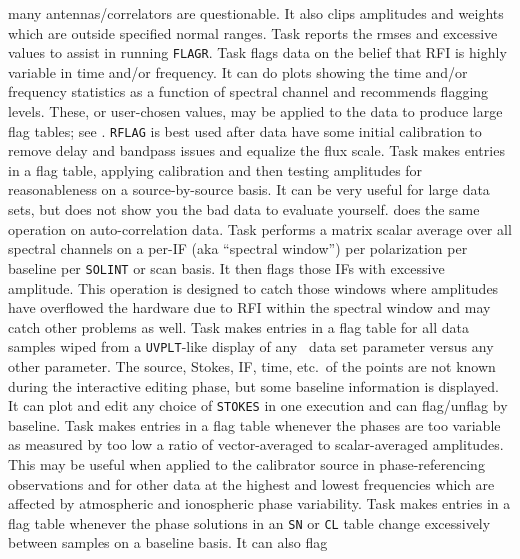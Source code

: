     many antennas/correlators are questionable.  It also clips
    amplitudes and weights which are outside specified normal ranges.
    Task {\tt {}} reports the rmses and excessive values to
    assist in running {\tt FLAGR}\@.
\Item Task {\tt {}} flags data on the belief that RFI is
    highly variable in time and/or frequency.  It can do plots showing
    the time and/or frequency statistics as a function of spectral
    channel and recommends flagging levels.  These, or user-chosen
    values, may be applied to the data to produce large flag tables;
    see .  {\tt RFLAG} is best used after data have some
    initial calibration to remove delay and bandpass issues and
    equalize the flux scale.
\Item Task {\tt {}} makes entries in a flag table, applying
    calibration and then testing amplitudes for reasonableness on a
    source-by-source basis.  It can be very useful for large data
    sets, but does not show you the bad data to evaluate yourself.
    {\tt {}} does the same operation on auto-correlation
    data.
\Item Task {\tt {}} performs a matrix scalar average over
    all spectral channels on a per-IF (aka ``spectral window'') per
    polarization per baseline per {\tt SOLINT} or scan  basis.  It
    then flags those IFs with excessive amplitude.  This operation is
    designed to catch those windows where amplitudes have overflowed
    the hardware due to RFI within the spectral window and may catch
    other problems as     well.
\Item Task {\tt {}} makes entries in a flag table for all
    data samples wiped from a {\tt UVPLT}-like display of any \uv\
    data set parameter versus any other parameter.  The source,
    Stokes, IF, time, etc.~of the points are not known during the
    interactive editing phase, but some baseline information is
    displayed.  It can plot and edit any choice of {\tt STOKES} in one
    execution and can flag/unflag by baseline.
\Item Task {\tt {}} makes entries in a flag table whenever
    the phases are too variable as measured by too low a ratio of
    vector-averaged to scalar-averaged amplitudes.  This may be useful
    when applied to the calibrator source in phase-referencing
    observations and for other data at the highest and lowest
    frequencies which are affected by atmospheric and ionospheric phase
    variability.
\Item Task {\tt {}} makes entries in a flag table whenever
    the phase solutions in an {\tt SN} or {\tt CL} table change
    excessively between samples on a baseline basis.  It can also flag
